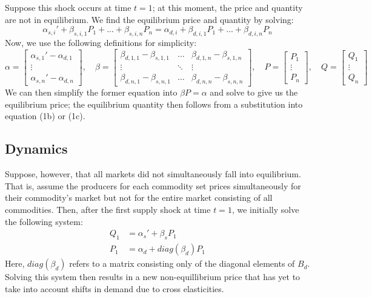 \documentclass[12pt]{article}
\begin{document}
Suppose this shock occurs at time $t=1$; at this moment, the price and quantity are not in equilibrium. We find the equilibrium price and quantity by solving:
$$ \alpha_{s,i}' + \beta_{s,i,1} P_1 + ... + \beta_{s,i,n} P_n = \alpha_{d,i} + \beta_{d,i,1} P_1 + ... + \beta_{d,i,n} P_n$$
Now, we use the following definitions for simplicity:
$$ 
\alpha=\begin{bmatrix}
 	\alpha_{s,1}' - \alpha_{d,1} \\
 	\vdots\\
 	\alpha_{s,n}' - \alpha_{d,n}
\end{bmatrix} 
,\quad
\beta=\begin{bmatrix}
\beta_{d,1,1} - \beta_{s,1,1} & \dots & \beta_{d,1,n} - \beta_{s,1,n} \\
\vdots & \ddots & \vdots \\
\beta_{d,n,1} - \beta_{s,n,1} & \dots & \beta_{d,n,n} - \beta_{s,n,n}
\end{bmatrix} 
,\quad
P=\begin{bmatrix}
P_1 \\
\vdots\\
P_n
\end{bmatrix} 
,\quad
Q=\begin{bmatrix}
Q_1 \\
\vdots\\
Q_n
\end{bmatrix} 
$$
We can then simplify the former equation into $\beta P = \alpha$ and solve to give us the equilibrium price; the equilibrium quantity then follows from a substitution into equation (1b) or (1c). 

\subsection{Dynamics}

Suppose, however, that all markets did not simultaneously fall into equilibrium. That is, assume the producers for each commodity set prices simultaneously for their commodity's market but not for the entire market consisting of all commodities. Then, after the first supply shock at time $t=1$, we initially solve the following system:
\begin{align*}
Q_{1} &= \alpha_s' + \beta_s P_1 \\
P_{1}& = \alpha_d  + diag(\beta_d) P_1
\end{align*}
Here, $diag(\beta_d)$ refers to a matrix consisting only of the diagonal elements of $B_d$. Solving this system then results in a new non-equillibrium price that has yet to take into account shifts in demand due to cross elasticities.
\end{document}
